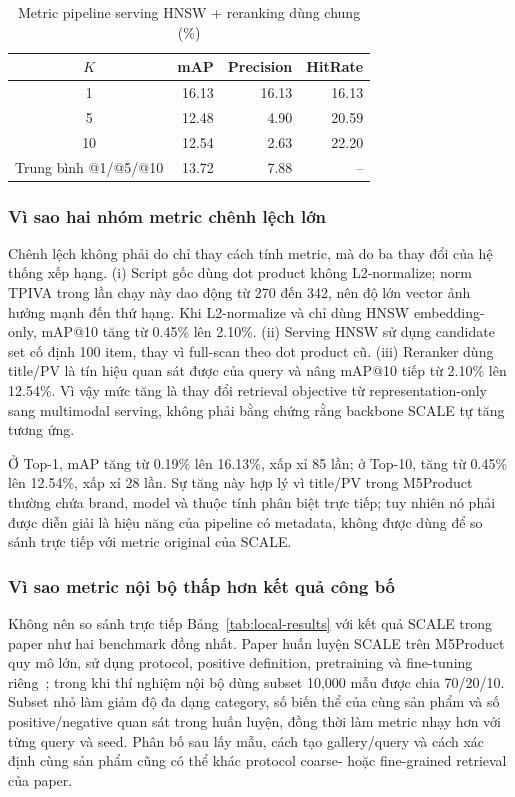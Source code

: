 \documentclass[10pt,conference]{IEEEtran}
\begin{document}
\begin{table}[t]
\centering
\caption{Metric pipeline serving HNSW + reranking dùng chung (\%)}
\label{tab:serving-results}
\small
\begin{tabular}{crrr}
\toprule
$K$ & mAP & Precision & HitRate\\
\midrule
1  & 16.13 & 16.13 & 16.13\\
5  & 12.48 & 4.90 & 20.59\\
10 & 12.54 & 2.63 & 22.20\\
\midrule
Trung bình @1/@5/@10 & 13.72 & 7.88 & --\\
\bottomrule
\end{tabular}
\end{table}

\subsubsection{Vì sao hai nhóm metric chênh lệch lớn}

Chênh lệch không phải do chỉ thay cách tính metric, mà do ba thay đổi của hệ thống xếp hạng. (i) Script gốc dùng dot product không L2-normalize; norm TPIVA trong lần chạy này dao động từ 270 đến 342, nên độ lớn vector ảnh hưởng mạnh đến thứ hạng. Khi L2-normalize và chỉ dùng HNSW embedding-only, mAP@10 tăng từ 0.45\% lên 2.10\%. (ii) Serving HNSW sử dụng candidate set cố định 100 item, thay vì full-scan theo dot product cũ. (iii) Reranker dùng title/PV là tín hiệu quan sát được của query và nâng mAP@10 tiếp từ 2.10\% lên 12.54\%. Vì vậy mức tăng là thay đổi retrieval objective từ representation-only sang multimodal serving, không phải bằng chứng rằng backbone SCALE tự tăng tương ứng.

Ở Top-1, mAP tăng từ 0.19\% lên 16.13\%, xấp xỉ 85 lần; ở Top-10, tăng từ 0.45\% lên 12.54\%, xấp xỉ 28 lần. Sự tăng này hợp lý vì title/PV trong M5Product thường chứa brand, model và thuộc tính phân biệt trực tiếp; tuy nhiên nó phải được diễn giải là hiệu năng của pipeline có metadata, không được dùng để so sánh trực tiếp với metric original của SCALE.

\subsubsection{Vì sao metric nội bộ thấp hơn kết quả công bố}

Không nên so sánh trực tiếp Bảng~\ref{tab:local-results} với kết quả SCALE trong paper như hai benchmark đồng nhất. Paper huấn luyện SCALE trên M5Product quy mô lớn, sử dụng protocol, positive definition, pretraining và fine-tuning riêng~\cite{dong2022m5product}; trong khi thí nghiệm nội bộ dùng subset 10,000 mẫu được chia 70/20/10. Subset nhỏ làm giảm độ đa dạng category, số biến thể của cùng sản phẩm và số positive/negative quan sát trong huấn luyện, đồng thời làm metric nhạy hơn với từng query và seed. Phân bố sau lấy mẫu, cách tạo gallery/query và cách xác định cùng sản phẩm cũng có thể khác protocol coarse- hoặc fine-grained retrieval của paper.
\end{document}
